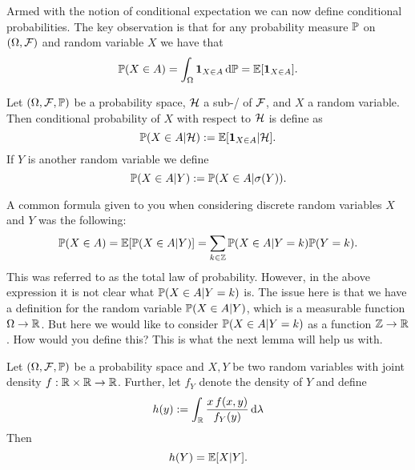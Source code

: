 Armed with the notion of conditional expectation we can now define conditional probabilities. The key observation is that for any probability measure $\mathbb P$ on $(\Omega, \mathcal F)$ and random variable $X$ we have that
\[
	\mathbb P(X \in A) = \int_\Omega \mathbf{1}_{X \in A} \, \mathrm{d} \mathbb P = \mathbb E[\mathbf{1}_{X \in A}].
\]

\begin{definition}
Let $(\Omega, \mathcal F, \mathbb P)$ be a probability space, $\mathcal H$ a sub-\sigalg/ of $\mathcal F$, and $X$ a random variable. Then conditional probability of $X$ with respect to $\mathcal H$ is define as
\[
	\mathbb P(X \in A | \mathcal H) := \mathbb E[\mathbf{1}_{X \in A} | \mathcal H].
\]
If $Y$ is another random variable we define
\[
	\mathbb P(X \in A | Y) := \mathbb P(X \in A | \sigma(Y)).
\]
\end{definition}


A common formula given to you when considering discrete random variables $X$ and $Y$ was the following:
\begin{equation}\label{eq:law_of_probability_discrete}
	\mathbb P(X \in A) = \mathbb E[\mathbb P(X \in A | Y)] = \sum_{k \in \mathbb Z} \mathbb P(X \in A | Y= k) \mathbb P(Y = k). 
\end{equation}
This was referred to as the total law of probability. However, in the above expression it is not clear what $\mathbb P(X \in A | Y = k)$ is. The issue here is that we have a definition for the random variable $\mathbb P(X \in A | Y)$, which is a measurable function $\Omega \to \mathbb R$. But here we would like to consider $\mathbb P(X \in A | Y = k)$ as a function $\mathbb Z \to \mathbb R$. How would you define this? This is what the next lemma will help us with.

\begin{lemma}\label{lem:condition_expectation_Y_y}
Let $(\Omega, \mathcal F, \mathbb P)$ be a probability space and $X,Y$ be two random variables with joint density $f : \mathbb R \times \mathbb R \to \mathbb R$. Further, let $f_Y$ denote the density of $Y$ and define
\[
	h(y) := \int_{\mathbb R} \frac{x \, f(x,y)}{f_Y(y)} \, \mathrm{d} \lambda
\]
Then
\[
	h(Y) = \mathbb E[X | Y].
\]
\end{lemma}

